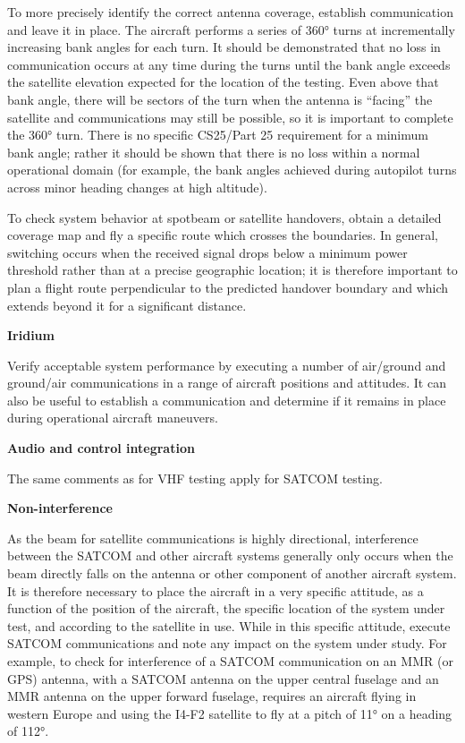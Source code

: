 \documentclass[
]{book}
\begin{document}
To more precisely identify the correct antenna coverage, establish
communication and leave it in place. The aircraft performs a series of 360°
turns at incrementally increasing bank angles for each turn. It should be
demonstrated that no loss in communication occurs at any time during the turns
until the bank angle exceeds the satellite elevation expected for the location
of the testing. Even above that bank angle, there will be sectors of the turn
when the antenna is ``facing'' the satellite and communications may still be
possible, so it is important to complete the 360° turn. There is no specific
CS25/Part 25 requirement for a minimum bank angle; rather it should be shown
that there is no loss within a normal operational domain (for example, the bank
angles achieved during autopilot turns across minor heading changes at high
altitude).

To check system behavior at spotbeam or satellite handovers, obtain a detailed
coverage map and fly a specific route which crosses the boundaries. In general,
switching occurs when the received signal drops below a minimum power threshold
rather than at a precise geographic location; it is therefore important to plan
a flight route perpendicular to the predicted handover boundary and which
extends beyond it for a significant distance.

\textbf{Iridium}

Verify acceptable system performance by executing a number of air/ground and
ground/air communications in a range of aircraft positions and attitudes. It
can also be useful to establish a communication and determine if it remains in
place during operational aircraft maneuvers.

\textbf{Audio and control integration}

The same comments as for VHF testing apply for SATCOM testing.

\textbf{Non-interference}

As the beam for satellite communications is highly directional, interference
between the SATCOM and other aircraft systems generally only occurs when the
beam directly falls on the antenna or other component of another aircraft
system. It is therefore necessary to place the aircraft in a very specific
attitude, as a function of the position of the aircraft, the specific location
of the system under test, and according to the satellite in use. While in this
specific attitude, execute SATCOM communications and note any impact on the
system under study. For example, to check for interference of a SATCOM
communication on an MMR (or GPS) antenna, with a SATCOM antenna on the upper
central fuselage and an MMR antenna on the upper forward fuselage, requires an
aircraft flying in western Europe and using the I4-F2 satellite to fly at a
pitch of 11° on a heading of 112°.
\end{document}

